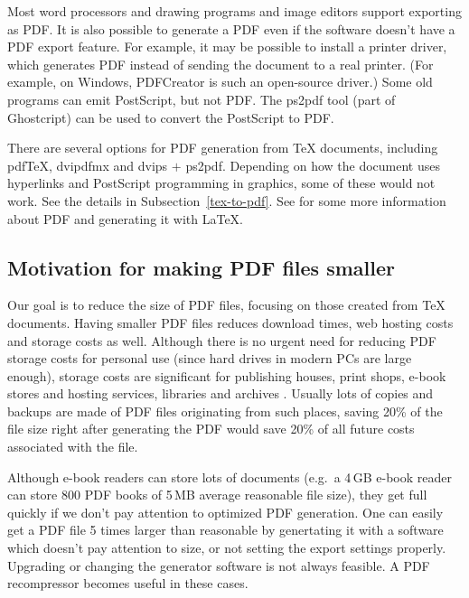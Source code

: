 \documentclass{ltugproc}
\def\cmd{\textsf}
\begin{document}
Most word processors and drawing programs and image editors support
exporting as PDF. It is also possible to generate a PDF even if the software
doesn't have a PDF export feature. For example, it may be possible to
install a printer driver, which generates PDF instead of sending the
document to a real printer. (For example, on Windows, PDFCreator
\cite{pdfcreator} is such an open-source driver.) Some old programs can emit
PostScript, but not PDF. The \cmd{ps2pdf} \cite{ps2df} tool (part of
Ghostcript) can be used to convert the PostScript to PDF.

There are several options for PDF generation from
\TeX{} documents, including
pdf\TeX{}, \cmd{dvipdfmx} and \cmd{dvips} $+$ \cmd{ps2pdf}. Depending on how
the document uses hyperlinks and PostScript programming in graphics, some of
these would not work. See the details in Subsection~\ref{tex-to-pdf}. See
\cite{creative-pdf} for
some more information about PDF and generating it with \LaTeX{}.

\subsection{Motivation for making PDF files smaller}

Our goal is to reduce the size of PDF files, focusing on those
created from \TeX{} documents. Having smaller PDF files reduces download
times, web hosting costs and storage costs as well. Although there is no
urgent need for reducing PDF storage costs for personal use (since hard
drives in modern PCs are large enough), storage costs are significant for
publishing houses, print shops, e-book stores and hosting services,
libraries and archives \cite{multivalent-article}.
Usually lots of copies and backups are made of PDF
files originating from such places, saving 20\% of the file size right after
generating the PDF would save 20\% of all future costs associated with the
file.

Although e-book readers can store lots of documents (e.g.\ a 4\,GB e-book
reader can store 800 PDF books of 5\,MB average reasonable file size), they
get full quickly if we don't pay attention to optimized PDF generation. One
can easily get a PDF file 5 times larger than reasonable by genertating it
with a software which doesn't pay attention to size,
or not setting the export settings
properly. Upgrading or changing the generator software is not always
feasible. A PDF recompressor becomes useful in these cases.
\end{document}
